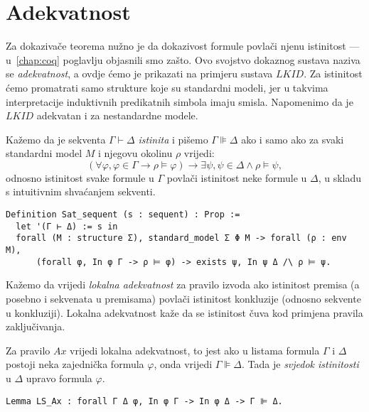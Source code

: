 \section{Adekvatnost}\label{sec:adekvatnost}
Za dokazivače teorema nužno je da dokazivost formule povlači njenu istinitost ---
u~\ref{chap:coq} poglavlju objasnili smo zašto.
Ovo svojstvo dokaznog sustava naziva se \textit{adekvatnost},
a ovdje ćemo je prikazati na primjeru sustava \(\mathit{LKID}\).
Za istinitost ćemo promatrati samo strukture koje su standardni modeli,
jer u takvima interpretacije induktivnih predikatnih simbola imaju smisla.
Napomenimo da je \(\mathit{LKID}\) adekvatan i za nestandardne modele.

\begin{definition}
  Kažemo da je sekventa \(\Gamma \vdash \Delta\) \textit{istinita} i pišemo \(\Gamma \VDash \Delta\) ako i samo ako
  za svaki standardni model \(M\) i njegovu okolinu \(\rho\) vrijedi:
  \[
    (\forall \varphi, \varphi \in \Gamma \rightarrow \rho \vDash \varphi) \rightarrow \exists \psi, \psi \in \Delta \land \rho \vDash \psi,
  \]
  \noindent odnosno istinitost svake formule u \(\Gamma\) povlači istinitost neke formule u \(\Delta\),
  u skladu s intuitivnim shvaćanjem sekventi.
\begin{verbatim}
Definition Sat_sequent (s : sequent) : Prop :=
  let '(Γ ⊢ Δ) := s in            
  forall (M : structure Σ), standard_model Σ Φ M -> forall (ρ : env M),
      (forall φ, In φ Γ -> ρ ⊨ φ) -> exists ψ, In ψ Δ /\ ρ ⊨ ψ.
\end{verbatim}
\end{definition}

Kažemo da vrijedi \textit{lokalna adekvatnost} za pravilo izvoda
ako istinitost premisa (a posebno i sekvenata u premisama) povlači istinitost konkluzije (odnosno sekvente u konkluziji).
Lokalna adekvatnost kaže da se istinitost čuva kod primjena pravila zaključivanja.

\begin{example}
  Za pravilo \(\mathit{Ax}\) vrijedi lokalna adekvatnost,
  to jest ako u listama formula \(\Gamma\) i \(\Delta\) postoji neka zajednička formula \(\varphi\),
  onda vrijedi \(\Gamma \VDash \Delta\). Tada je \textit{svjedok istinitosti} u \(\Delta\) upravo formula \(\varphi\).
\begin{verbatim}
Lemma LS_Ax : forall Γ Δ φ, In φ Γ -> In φ Δ -> Γ ⊫ Δ.
\end{verbatim}
\end{example}

